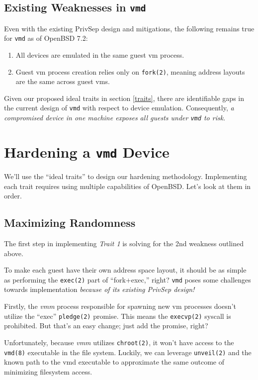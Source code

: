 \documentclass[conference]{IEEEtran}
\begin{document}
\subsection{Existing Weaknesses in \texttt{vmd}}
Even with the existing PrivSep design and mitigations, the following
remains true for \texttt{vmd} as of OpenBSD 7.2:

\begin{enumerate}
\item All devices are emulated in the same guest vm process.
\item Guest vm process creation relies only on \texttt{fork(2)},
  meaning address layouts are the same across guest vms.
\end{enumerate}

Given our proposed ideal traits in section \ref{traits}, there are
identifiable gaps in the current design of \texttt{vmd} with respect
to device emulation. Consequently, \emph{a compromised device in one
machine exposes all guests under \texttt{vmd} to risk}.

\section{Hardening a \texttt{vmd} Device}
We'll use the ``ideal traits'' to design our hardening
methodology. Implementing each trait requires using multiple
capabilities of OpenBSD. Let's look at them in order.

\subsection{Maximizing Randomness}
The first step in implementing \emph{Trait 1} is solving for the 2nd
weakness outlined above.

To make each guest have their own address space layout, it should be
as simple as performing the \texttt{exec(2)} part of ``fork+exec,''
right? \texttt{vmd} poses some challenges towards implementation
\emph{because of its existing PrivSep design!}

Firstly, the \emph{vmm} process responsible for spawning new vm
processes doesn't utilize the ``exec'' \texttt{pledge(2)}
promise. This means the \texttt{execvp(2)} syscall is prohibited. But
that's an easy change; just add the promise, right?

Unfortunately, because \emph{vmm} utilizes \texttt{chroot(2)}, it
won't have access to the \texttt{vmd(8)} executable in the file
system. Luckily, we can leverage \texttt{unveil(2)} and the known path
to the vmd executable to approximate the same outcome of minimizing
filesystem access.
\end{document}
